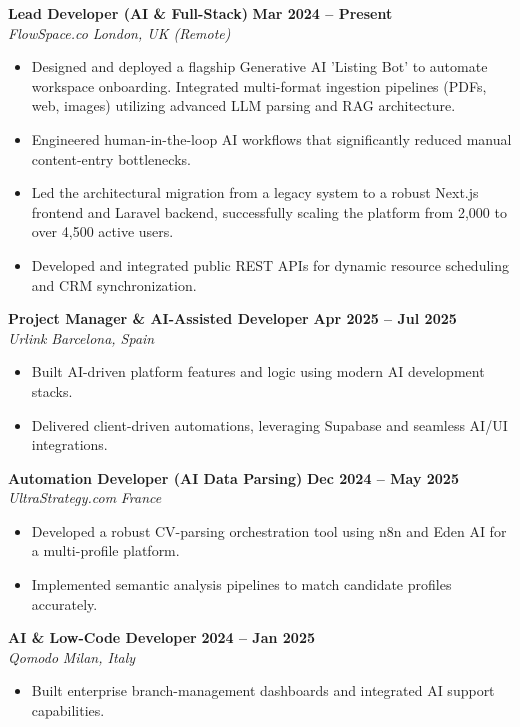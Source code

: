 \documentclass[10pt,a4paper]{article}
\begin{document}
\textbf{Lead Developer (AI \& Full-Stack)} \hfill \textbf{Mar 2024 -- Present} \\
\textit{FlowSpace.co} \hfill \textit{London, UK (Remote)}
\begin{itemize}[leftmargin=*,noitemsep]
    \item Designed and deployed a flagship Generative AI 'Listing Bot' to automate workspace onboarding. Integrated multi-format ingestion pipelines (PDFs, web, images) utilizing advanced LLM parsing and RAG architecture.
    \item Engineered human-in-the-loop AI workflows that significantly reduced manual content-entry bottlenecks.
    \item Led the architectural migration from a legacy system to a robust Next.js frontend and Laravel backend, successfully scaling the platform from 2,000 to over 4,500 active users.
    \item Developed and integrated public REST APIs for dynamic resource scheduling and CRM synchronization.
\end{itemize}

\textbf{Project Manager \& AI-Assisted Developer} \hfill \textbf{Apr 2025 -- Jul 2025} \\
\textit{Urlink} \hfill \textit{Barcelona, Spain}
\begin{itemize}[leftmargin=*,noitemsep]
    \item Built AI-driven platform features and logic using modern AI development stacks.
    \item Delivered client-driven automations, leveraging Supabase and seamless AI/UI integrations.
\end{itemize}

\textbf{Automation Developer (AI Data Parsing)} \hfill \textbf{Dec 2024 -- May 2025} \\
\textit{UltraStrategy.com} \hfill \textit{France}
\begin{itemize}[leftmargin=*,noitemsep]
    \item Developed a robust CV-parsing orchestration tool using n8n and Eden AI for a multi-profile platform.
    \item Implemented semantic analysis pipelines to match candidate profiles accurately.
\end{itemize}

\textbf{AI \& Low-Code Developer} \hfill \textbf{2024 -- Jan 2025} \\
\textit{Qomodo} \hfill \textit{Milan, Italy}
\begin{itemize}[leftmargin=*,noitemsep]
    \item Built enterprise branch-management dashboards and integrated AI support capabilities.
\end{itemize}
\end{document}
